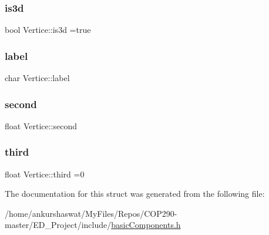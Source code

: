 \subsubsection{\texorpdfstring{is3d}{is3d}}
{\footnotesize\ttfamily bool Vertice\+::is3d =true}

\mbox{\label{structVertice_a0181015506ba076b22502bba2c02f4cf}} 
\subsubsection{\texorpdfstring{label}{label}}
{\footnotesize\ttfamily char Vertice\+::label}

\mbox{\label{structVertice_a3b09ccd0c9d23978cb17ebe303b498a2}} 
\subsubsection{\texorpdfstring{second}{second}}
{\footnotesize\ttfamily float Vertice\+::second}

\mbox{\label{structVertice_a781306a1aba368740f76928fc4b3b6bc}} 
\subsubsection{\texorpdfstring{third}{third}}
{\footnotesize\ttfamily float Vertice\+::third =0}



The documentation for this struct was generated from the following file\+:\begin{DoxyCompactItemize}
\item 
/home/ankurshaswat/\+My\+Files/\+Repos/\+C\+O\+P290-\/master/\+E\+D\+\_\+\+Project/include/\hyperlink{basicComponents_8h}{basic\+Components.\+h}\end{DoxyCompactItemize}
